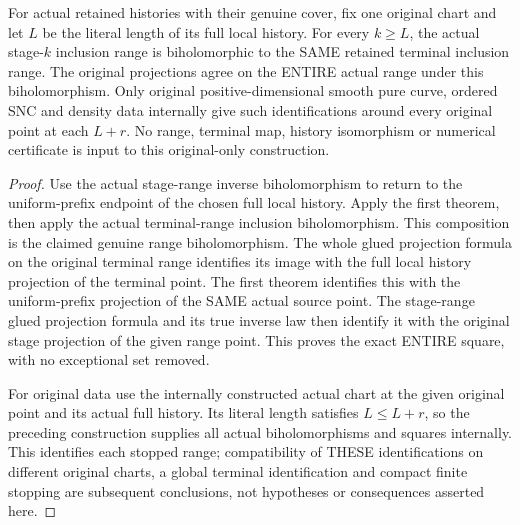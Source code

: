 \begin{theorem}
\label{hir:sharp-actual-curve-stopped-stage-terminal-range}
\leanok
For actual retained histories with their genuine cover, fix one original
chart and let $L$ be the literal length of its full local history. For
every $k\ge L$, the actual stage-$k$ inclusion range is biholomorphic to
the SAME retained terminal inclusion range. The original projections
agree on the ENTIRE actual range under this biholomorphism. Only original
positive-dimensional smooth pure curve, ordered SNC and density data
internally give such identifications around every original point at each
$L+r$. No range, terminal map, history isomorphism or numerical certificate
is input to this original-only construction.
\end{theorem}
\begin{proof}
Use the actual stage-range inverse biholomorphism to return to the
uniform-prefix endpoint of the chosen full local history. Apply the
first theorem, then apply the actual terminal-range inclusion
biholomorphism. This composition is the claimed genuine range
biholomorphism. The whole glued projection formula on the original
terminal range identifies its image with the full local history
projection of the terminal point. The first theorem identifies this
with the uniform-prefix projection of the SAME actual source point.
The stage-range glued projection formula and its true inverse law then
identify it with the original stage projection of the given range point.
This proves the exact ENTIRE square, with no exceptional set removed.

For original data use the internally constructed actual chart at the
given original point and its actual full history. Its literal length
satisfies $L\le L+r$, so the preceding construction supplies all actual
biholomorphisms and squares internally. This identifies each stopped
range; compatibility of THESE identifications on different original
charts, a global terminal identification and compact finite stopping are
subsequent conclusions, not hypotheses or consequences asserted here.
\end{proof}
